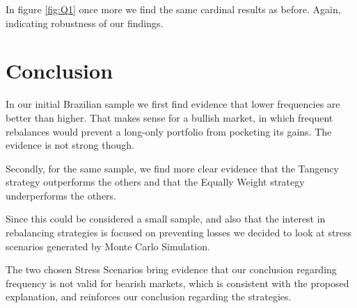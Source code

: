 \documentclass[paper=a4, fontsize=11pt]{scrartcl} %
\numberwithin{equation}{section} %
\numberwithin{figure}{section} %
\numberwithin{table}{section} %
\begin{document}
In figure \ref{fig:Q1} once more we find the same cardinal results as before. Again, indicating robustness of our findings.

\section{Conclusion}

In our initial Brazilian sample we first find evidence that lower frequencies are better than higher. That makes sense for a bullish market, in which frequent rebalances would prevent a long-only portfolio from pocketing its gains. The evidence is not strong though.

Secondly, for the same sample, we find more clear evidence that the Tangency strategy outperforms the others and that the Equally Weight strategy underperforms the others.

Since this could be considered a small sample, and also that the interest in rebalancing strategies is focused on preventing losses we decided to look at stress scenarios generated by Monte Carlo Simulation.

The two chosen Stress Scenarios bring evidence that our conclusion regarding frequency is not valid for bearish markets, which is consistent with the proposed explanation, and reinforces our conclusion regarding the strategies.
\end{document}
